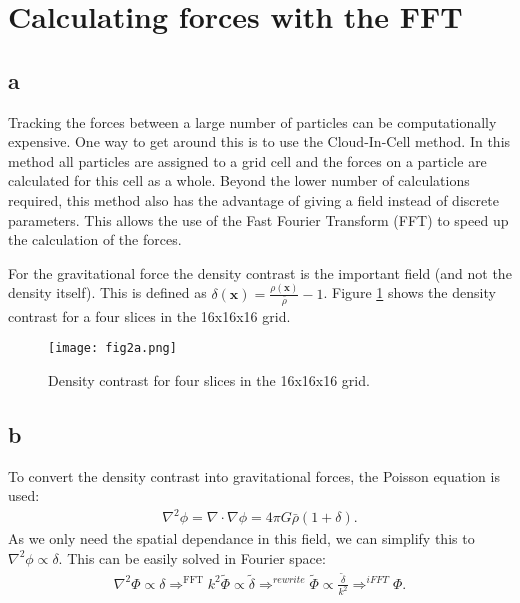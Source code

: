 \section{Calculating forces with the FFT}


\subsection*{a}
Tracking the forces between a large number of particles can be computationally expensive.
One way to get around this is to use the Cloud-In-Cell method.
In this method all particles are assigned to a grid cell and the forces on a particle are calculated for this cell as a whole.
Beyond the lower number of calculations required, this method also has the advantage of giving a field instead of discrete parameters.
This allows the use of the Fast Fourier Transform (FFT) to speed up the calculation of the forces.

For the gravitational force the density contrast is the important field (and not the density itself).
This is defined as $\delta(\mathbf{x}) = \frac{\rho(\mathbf{x})}{\bar{\rho}} - 1$.
Figure \ref{fig:density_contrast} shows the density contrast for a four slices in the 16x16x16 grid.
\begin{figure}
    \centering
    \texttt{[image: fig2a.png]}
    \caption{Density contrast for four slices in the 16x16x16 grid.}
    \label{fig:density_contrast}
\end{figure}



\subsection*{b}
To convert the density contrast into gravitational forces, the Poisson equation is used:
\begin{align}
    \nabla^2 \phi = \nabla \cdot \nabla \phi = 4 \pi G \bar{\rho} (1 + \delta).
\end{align}
As we only need the spatial dependance in this field, we can simplify this to $\nabla^2 \phi \propto \delta$.
This can be easily solved in Fourier space:
\begin{align}
    \nabla^2 \Phi \propto \delta \Rightarrow^{\text{FFT}} k^2 \tilde{\Phi} \propto \tilde{\delta} \Rightarrow^{rewrite} \tilde{\Phi} \propto \frac{\tilde{\delta}}{k^2}
    \Rightarrow^{iFFT} \Phi.    
\end{align}

